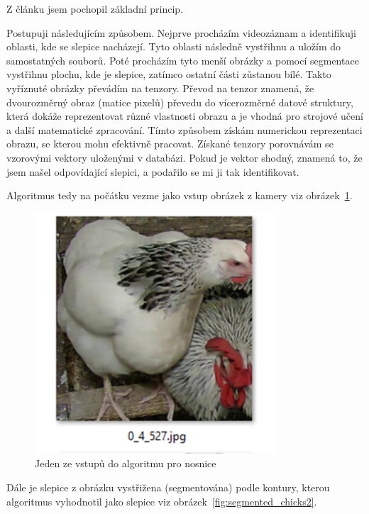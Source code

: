 Z článku jsem pochopil základní princip.

Postupuji následujícím způsobem.
Nejprve procházím videozáznam a identifikuji oblasti, kde se slepice nacházejí.
Tyto oblasti následně vystřihnu a uložím do samostatných souborů.
Poté procházím tyto menší obrázky a pomocí segmentace vystřihnu plochu, kde je slepice, zatímco ostatní části zůstanou bílé.
Takto vyříznuté obrázky převádím na tenzory.
Převod na tenzor znamená, že dvourozměrný obraz (matice pixelů) převedu do vícerozměrné datové struktury, která dokáže reprezentovat různé vlastnosti obrazu a je vhodná pro strojové učení a další matematické zpracování.
Tímto způsobem získám numerickou reprezentaci obrazu, se kterou mohu efektivně pracovat.
Získané tenzory porovnávám se vzorovými vektory uloženými v databázi.
Pokud je vektor shodný, znamená to, že jsem našel odpovídající slepici, a podařilo se mi ji tak identifikovat.

Algoritmus tedy na počátku vezme jako vstup obrázek z kamery viz obrázek~\ref{fig:source_chick_image}.

\begin{figure}[H]
    \centering
    \includegraphics[width=0.8\textwidth]{img/source_chick_image}
    \caption{Jeden ze vstupů do algoritmu pro nosnice}
    \label{fig:source_chick_image}
\end{figure}

Dále je slepice z obrázku vystřižena (segmentována) podle kontury, kterou algoritmus vyhodnotil jako slepice viz obrázek~\ref{fig:segmented_chicks2}.

